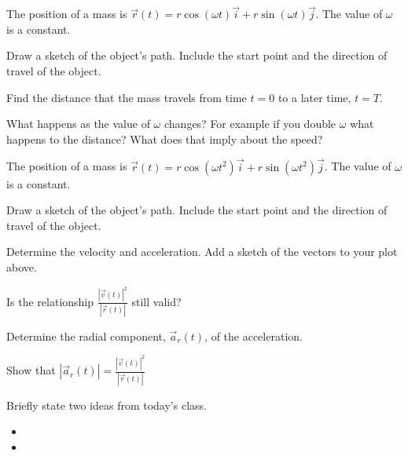 \begin{problem}
\item The position of a mass is
  $\vec{r}(t)=r\cos(\omega t)\vec{i}+r\sin(\omega t)\vec{j}$. The
  value of $\omega$ is a constant.
  \begin{subproblem}
  \item Draw a sketch of the object's path. Include the start point
    and the direction of travel of the object.  \vfill
    \vfill
  \item Find the distance that the mass travels from time $t=0$ to a
    later time, $t=T$.
    \vfill
  \item What happens as the value of $\omega$ changes? For example
    if you double $\omega$ what happens to the distance? What does
    that imply about the speed?
    \vfill
  \end{subproblem}
  \clearpage
\item The position of a mass is
  $\vec{r}(t)=r\cos(\omega t^2)\vec{i}+r\sin(\omega t^2)\vec{j}$. The
  value of $\omega$ is a constant.
  \begin{subproblem}
  \item Draw a sketch of the object's path. Include the start point
    and the direction of travel of the object.
    \vfill
  \item Determine the velocity and acceleration. Add a sketch of the
    vectors to your plot above.
    \vfill
  \item Is the relationship $\frac{|\vec{v}(t)|^2}{|\vec{r}(t)|}$
    still valid?
    \vfill
  \item Determine the radial component, $\vec{a}_r(t)$, of the
    acceleration.
    \vfill
  \item Show that $|\vec{a}_r(t)| = \frac{|\vec{v}(t)|^2}{|\vec{r}(t)|}$
    \vfill
  \end{subproblem}
\end{problem}

\postClass

\begin{problem}
\item Briefly state two ideas from today's class.
  \begin{itemize}
  \item 
  \item 
  \end{itemize}
\item 
  \begin{subproblem}
    \item
  \end{subproblem}
\end{problem}


